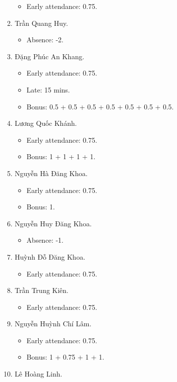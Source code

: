 \documentclass{article}
\begin{document}
\begin{enumerate}
	\begin{itemize}
		\item Early attendance: 0.75.
	\end{itemize}
	\item {\sc Trần Quang Huy.}
	\begin{itemize}
		\item Absence: -2.
	\end{itemize}
	\item {\sc Đặng Phúc An Khang.}
	\begin{itemize}
		\item Early attendance: 0.75.
		\item Late: 15 mins.
		\item Bonus: 0.5 + 0.5 + 0.5 + 0.5 + 0.5 + 0.5 + 0.5.
	\end{itemize}
	\item {\sc Lương Quốc Khánh.}
	\begin{itemize}
		\item Early attendance: 0.75.
		\item Bonus: 1 + 1 + 1 + 1.
	\end{itemize}
	\item {\sc Nguyễn Hà Đăng Khoa}.
	\begin{itemize}
		\item Early attendance: 0.75.
		\item Bonus: 1.
	\end{itemize}
	\item {\sc Nguyễn Huy Đăng Khoa.}
	\begin{itemize}
		\item Absence: -1.
	\end{itemize}
	\item {\sc Huỳnh Đỗ Đăng Khoa.}
	\begin{itemize}
		\item Early attendance: 0.75.
	\end{itemize}
	\item {\sc Trần Trung Kiên.}
	\begin{itemize}
		\item Early attendance: 0.75.
	\end{itemize}
	\item {\sc Nguyễn Huỳnh Chí Lâm.}
	\begin{itemize}
		\item Early attendance: 0.75.
		\item Bonus: 1 + 0.75 + 1 + 1.
	\end{itemize}
	\item {\sc Lê Hoàng Linh.}

\end{enumerate}
\end{document}
